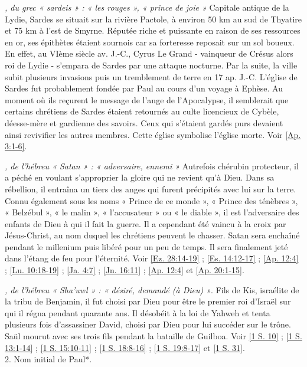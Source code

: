 \begin{multicols}{2}
\textit{, du grec « sardeis » : « les rouges », « prince de joie »}\newline
Capitale antique de la Lydie, Sardes se situait sur la rivière Pactole, à environ 50 km au sud de Thyatire et 75 km à l'est de Smyrne. Réputée riche et puissante en raison de ses ressources en or, ses épithètes étaient sournois car sa forteresse reposait sur un sol boueux. En effet, au VIème siècle av. J.-C., Cyrus Le Grand - vainqueur de Crésus alors roi de Lydie - s'empara de Sardes par une attaque nocturne. Par la suite, la ville subit plusieurs invasions puis un tremblement de terre en 17 ap. J.-C. L'église de Sardes fut probablement fondée par Paul au cours d'un voyage à Ephèse. Au moment où ils reçurent le message de l'ange de l'Apocalypse, il semblerait que certains chrétiens de Sardes étaient retournés au culte licencieux de Cybèle, déesse-mère et gardienne des savoirs. Ceux qui s'étaient gardés purs devaient ainsi revivifier les autres membres. Cette église symbolise l'église morte. Voir \vref{Ap. 3:1-6}.

\textit{, de l'hébreu « Satan » : « adversaire, ennemi »}\newline
Autrefois chérubin protecteur, il a péché en voulant s'approprier la gloire qui ne revient qu'à Dieu. Dans sa rébellion, il entraîna un tiers des anges qui furent précipités avec lui sur la terre. Connu également sous les noms « Prince de ce monde », « Prince des ténèbres », « Belzébul », « le malin », « l'accusateur » ou « le diable », il est l'adversaire des enfants de Dieu à qui il fait la guerre. Il a cependant été vaincu à la croix par Jésus-Christ, au nom duquel les chrétiens peuvent le chasser. Satan sera enchaîné pendant le millenium puis libéré pour un peu de temps. Il sera finalement jeté dans l'étang de feu pour l'éternité. Voir \vref{Ez. 28:14-19} ; \vref{Es. 14:12-17} ; \vref{Ap. 12:4} ; \vref{Lu. 10:18-19} ; \vref{Ja. 4:7} ; \vref{Jn. 16:11} ; \vref{Ap. 12:4} et \vref{Ap. 20:1-15}.

\textit{, de l'hébreu « Sha'uwl » : « désiré, demandé (à Dieu) »}. Fils de Kis, israélite de la tribu de Benjamin, il fut choisi par Dieu pour être le premier roi d'Israël sur qui il régna pendant quarante ans. Il désobéit à la loi de Yahweh et tenta plusieurs fois d'assassiner David, choisi par Dieu pour lui succéder sur le trône. Saül mourut avec ses trois fils pendant la bataille de Guilboa. Voir \vref{1 S. 10} ; \vref{1 S. 13:1-14} ; \vref{1 S. 15:10-11} ; \vref{1 S. 18:8-16} ; \vref{1 S. 19:8-17} et \vref{1 S. 31}.
\\2. Nom initial de Paul*.


\end{multicols}
